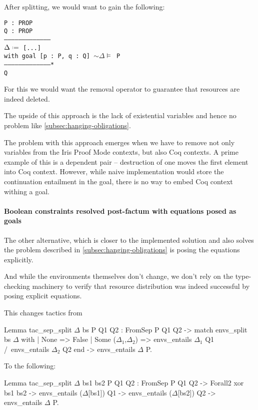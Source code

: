 After splitting, we would want to gain the following:

\begin{minipage}{\linewidth}
\texttt{P : PROP\\
Q : PROP\\
---------------------------------------\\
$\Delta \defeq$ [...]\\
with goal [p : P, q : Q] $\sim \Delta \vDash$ P\\
---------------------------------------*\\
Q
}
\end{minipage}

For this we would want the removal operator to guarantee that resources are indeed deleted.

The upside of this approach is the lack of existential variables and hence no problem like \ref{subsec:hanging-obligations}.

The problem with this approach emerges when we have to remove not only variables from the Iris Proof Mode contexts, but also Coq contexts.
A prime example of this is a dependent pair -- destruction of one moves the first element into Coq context.
However, while naive implementation would store the continuation entailment in the goal, there is no way to embed Coq context withing a goal.

\paragraph{Boolean constraints resolved post-factum with equations posed as goals}

The other alternative, which is closer to the implemented solution and also solves the problem described in \ref{subsec:hanging-obligations} is posing the equations explicitly.

And while the environments themselves don't change, we don't rely on the type-checking machinery to verify that resource distribution was indeed successful by posing explicit equations.

This changes tactics from
\begin{coq}
  Lemma tac_sep_split $\Delta$ bs P Q1 Q2 :
  FromSep P Q1 Q2 ->
  match envs_split bs $\Delta$ with
  | None => False
  | Some ($\Delta_1$,$\Delta_2$) => envs_entails $\Delta_1$ Q1 /\ envs_entails $\Delta_2$ Q2
  end -> envs_entails $\Delta$ P.
\end{coq}

To the following:
\begin{coq}
  Lemma tac_sep_split $\Delta$ bs1 bs2 P Q1 Q2 :
  FromSep P Q1 Q2 ->
  Forall2 xor bs1 bs2 ->
  envs_entails ($\Delta$[bs1]) Q1 ->
  envs_entails ($\Delta$[bs2]) Q2 ->
  envs_entails $\Delta$ P.
\end{coq}

